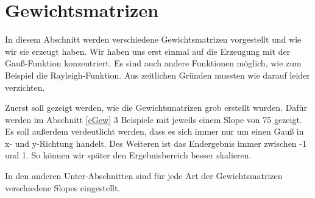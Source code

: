 \section{Gewichtsmatrizen} \label{gewichtsmatrizenSection}
In diesem Abschnitt werden verschiedene Gewichtsmatrizen vorgestellt und wie wir sie erzeugt haben. Wir haben uns erst einmal auf die Erzeugung mit der Gauß-Funktion konzentriert. Es sind auch andere Funktionen möglich, wie zum Beispiel die Rayleigh-Funktion. Aus zeitlichen Gründen mussten wie darauf leider verzichten.

Zuerst soll gezeigt werden, wie die Gewichtsmatrizen grob erstellt wurden. Dafür werden im Abschnitt \ref{eGew} 3 Beispiele mit jeweils einem Slope von 75 gezeigt. Es soll außerdem verdeutlicht werden, dass es sich immer nur um einen Gauß in x- und y-Richtung handelt. Des Weiteren ist das Endergebnis immer zwischen -1 und 1. So können wir später den Ergebnisbereich besser skalieren.

In den anderen Unter-Abschnitten sind für jede Art der Gewichtsmatrizen verschiedene Slopes eingestellt.

\newpage
